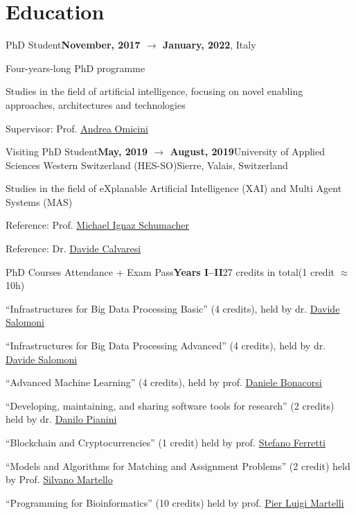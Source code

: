 

\section*{Education}

\begin{activity}{PhD Student}{\textbf{November, 2017 $\rightarrow$ January, 2022}}{\theprogramme}{\uniboen, Italy}
    \item Four-years-long PhD programme
	\item Studies in the field of artificial intelligence, focusing on novel enabling approaches, architectures and technologies
    \item Supervisor: Prof. \href{mailto:andrea.omicini@unibo.it}{Andrea Omicini}
\end{activity}

\begin{activity}{Visiting PhD Student}{\textbf{May, 2019 $\rightarrow$ August, 2019}}{University of Applied Sciences Western Switzerland (HES-SO)}{Sierre, Valais, Switzerland}
    \item Studies in the field of eXplanable Artificial Intelligence (XAI) and Multi Agent Systems (MAS)
    \item Reference:  Prof. \href{mailto:michael.schumacher@hevs.ch}{Michael Ignaz Schumacher}
    \item Reference:  Dr. \href{mailto:davide.calvaresi@hevs.ch}{Davide Calvaresi}
\end{activity}

\begin{activity}{PhD Courses Attendance + Exam Pass}{\textbf{Years I--II}}{27 credits in total}{(1 credit $\approx$ 10h)}
    \item ``Infrastructures for Big Data Processing Basic'' (4 credits), held by dr. \href{mailto:davide.salomoni@cnaf.infn.it}{Davide Salomoni}
    \item ``Infrastructures for Big Data Processing Advanced'' (4 credits), held by dr. \href{mailto:davide.salomoni@cnaf.infn.it}{Davide Salomoni}
    \item ``Advanced Machine Learning'' (4 credits), held by prof. \href{mailto:daniele.bonacorsi@bo.infn.it}{Daniele Bonacorsi}
    \item ``Developing, maintaining, and sharing software tools for research'' (2 credits) held by dr. \href{mailto:danilo.pianini@unibo.it}{Danilo Pianini}
    \item ``Blockchain and Cryptocurrencies'' (1 credit) held by prof. \href{mailto:stefano.ferretti@unibo.it}{Stefano Ferretti}
    \item ``Models and Algorithms for Matching and Assignment Problems'' (2 credit) held by Prof. \href{mailto:pierluigi.martelli@unibo.it}{Silvano Martello}
    \item ``Programming for Bioinformatics'' (10 credits) held by prof. \href{mailto:silvano.martello@unibo.it}{Pier Luigi Martelli}
\end{activity}

